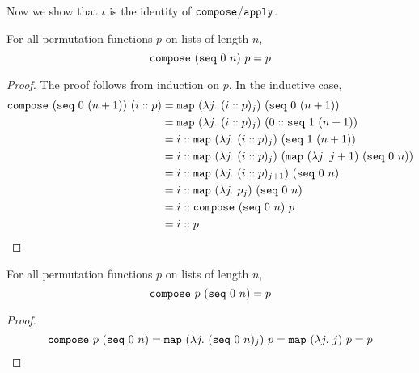 \documentclass[sigplan,10pt,anonymous,review]{thesis}
\begin{document}
Now we show that $\iota$ is the identity of $\texttt{\textup{compose}}$/$\texttt{\textup{apply}}$.
\begin{theorem}[compose\_id\_l]
  For all permutation functions $p$ on lists of length $n$,
  \begin{equation*}
    \texttt{\textup{compose}}~(\texttt{\textup{seq}}~0~n)~p = p
  \end{equation*}
\end{theorem}
\begin{proof}
  The proof follows from induction on $p$. In the inductive case,
  \begin{align*}
       \texttt{\textup{compose}}~(\texttt{\textup{seq}}~0~(n+1))~(i::p)
    &= \texttt{\textup{map}}~(\lambda j.~(i::p)_j)~(\texttt{\textup{seq}}~0~(n+1)) \\
    &= \texttt{\textup{map}}~(\lambda j.~(i::p)_j)~(0 :: \texttt{\textup{seq}}~1~(n+1)) \\
    &= i :: \texttt{\textup{map}}~(\lambda j.~(i::p)_j)~(\texttt{\textup{seq}}~1~(n+1)) \\
    &= i :: \texttt{\textup{map}}~(\lambda j.~(i::p)_j)~(\texttt{\textup{map}}~(\lambda j.~j+1)~(\texttt{\textup{seq}}~0~n)) \\
    &= i :: \texttt{\textup{map}}~(\lambda j.~(i::p)_{j+1})~(\texttt{\textup{seq}}~0~n) \\
    &= i :: \texttt{\textup{map}}~(\lambda j.~p_j)~(\texttt{\textup{seq}}~0~n) \\
    &= i :: \texttt{\textup{compose}}~(\texttt{\textup{seq}}~0~n)~p \\
    &= i :: p \qedhere
  \end{align*}
\end{proof}

\begin{theorem}[compose\_id\_r]
  For all permutation functions $p$ on lists of length $n$,
  \begin{equation*}
    \texttt{\textup{compose}}~p~(\texttt{\textup{seq}}~0~n) = p
  \end{equation*}
\end{theorem}
\begin{proof}
  \begin{equation*}
       \texttt{\textup{compose}}~p~(\texttt{\textup{seq}}~0~n)
    = \texttt{\textup{map}}~(\lambda j.~(\texttt{\textup{seq}}~0~n)_j)~p
    = \texttt{\textup{map}}~(\lambda j.~j)~p
    = p \qedhere
  \end{equation*}
\end{proof}
\end{document}
